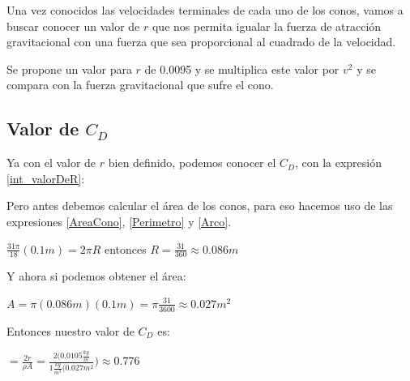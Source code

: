 Una vez conocidos las velocidades terminales de cada uno de los
conos, vamos a buscar conocer un valor de $r$ que nos permita
igualar la fuerza de atracción gravitacional con una fuerza que 
sea proporcional al cuadrado de la velocidad.

Se propone un valor para $r$ de 0.0095 y se multiplica este
valor por $v^2$ y se compara con la fuerza gravitacional que
sufre el cono.
\subsection{Valor de $C_D$}

Ya con el valor de $r$ bien definido, podemos conocer el
$C_D$, con la expresión \ref{int_valorDeR}:

Pero antes debemos calcular el área de los conos, para eso
hacemos uso de las expresiones \ref{AreaCono}, \ref{Perimetro}
y \ref{Arco}.

$\frac{31 \pi}{18}(0.1 m) = 2\pi R$
entonces $R = \frac{31}{360} \approx 0.086 m$

Y ahora si podemos obtener el área:

$A = \pi (0.086 m) (0.1 m) = \pi \frac{31}{3600} \approx 0.027m^2$

Entonces nuestro valor de $C_D$ es:

$ = \frac{2r}{\rho A} = \frac{2(0.0105\frac{kg}{m}}{1\frac{kg}{m^3}(0.027 m^2}) \approx 0.776$
